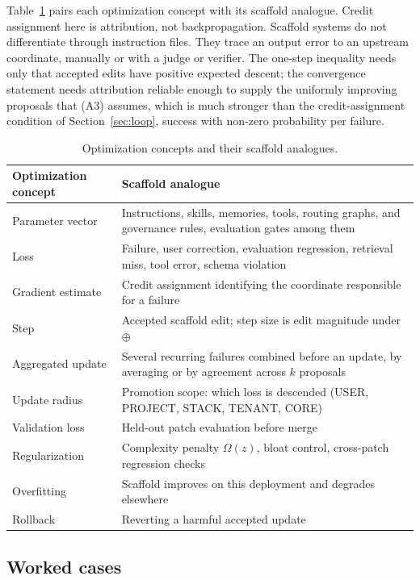 Table~\ref{tab:optim} pairs each optimization concept with its scaffold analogue. Credit assignment here is attribution, not backpropagation. Scaffold systems do not differentiate through instruction files. They trace an output error to an upstream coordinate, manually or with a judge or verifier. The one-step inequality needs only that accepted edits have positive expected descent; the convergence statement needs attribution reliable enough to supply the uniformly improving proposals that (A3) assumes, which is much stronger than the credit-assignment condition of Section~\ref{sec:loop}, success with non-zero probability per failure.

\begin{table}[h]
\centering\small
\begin{tabular}{>{\raggedright\arraybackslash}p{}>{\raggedright\arraybackslash}p{}}
\toprule
Optimization concept & Scaffold analogue \\
\midrule
Parameter vector & Instructions, skills, memories, tools, routing graphs, and governance rules, evaluation gates among them \\
Loss & Failure, user correction, evaluation regression, retrieval miss, tool error, schema violation \\
Gradient estimate & Credit assignment identifying the coordinate responsible for a failure \\
Step & Accepted scaffold edit; step size is edit magnitude under $\oplus$ \\
Aggregated update & Several recurring failures combined before an update, by averaging or by agreement across $k$ proposals \\
Update radius & Promotion scope: which loss is descended (USER, PROJECT, STACK, TENANT, CORE) \\
Validation loss & Held-out patch evaluation before merge \\
Regularization & Complexity penalty $\Omega(z)$, bloat control, cross-patch regression checks \\
Overfitting & Scaffold improves on this deployment and degrades elsewhere \\
Rollback & Reverting a harmful accepted update \\
\bottomrule
\end{tabular}
\caption{Optimization concepts and their scaffold analogues.}
\label{tab:optim}
\end{table}

\subsection{Worked cases}\label{worked-cases}

